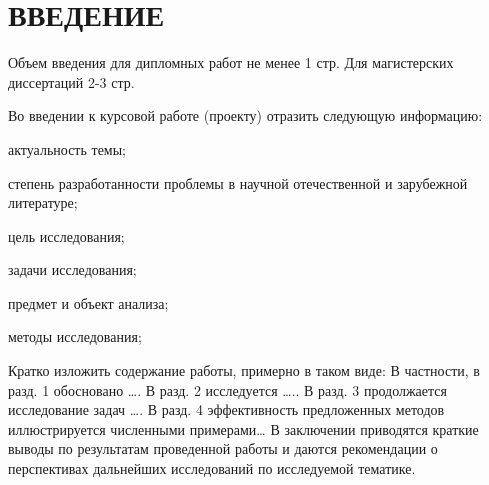 \chapter*{ВВЕДЕНИЕ}

Объем введения для дипломных работ не менее 1 стр. Для магистерских диссертаций 2-3 стр.

Во введении к курсовой работе (проекту)  отразить следующую
информацию:

актуальность темы;

степень разработанности проблемы в научной отечественной и
зарубежной литературе;

цель исследования;

задачи исследования;

предмет и объект анализа;

методы исследования;



Кратко изложить содержание работы, примерно в таком виде: В частности, в разд. 1 обосновано …. В разд. 2 исследуется ….. В разд. 3 продолжается исследование задач …. В разд. 4 эффективность предложенных методов иллюстрируется численными примерами… В заключении приводятся краткие выводы по результатам проведенной работы и даются рекомендации о перспективах дальнейших исследований по исследуемой тематике.

